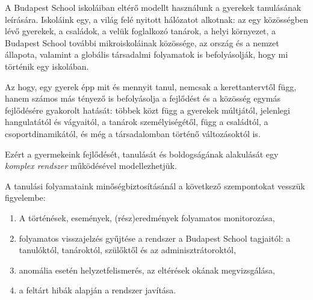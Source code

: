 A Budapest School iskoláiban eltérő modellt használunk a gyerekek tanulásának leírására. Iskoláink egy, a világ felé nyitott hálózatot alkotnak: az egy közösségben lévő gyerekek, a családok, a velük foglalkozó tanárok, a helyi környezet, a Budapest School további mikroiskoláinak közössége, az ország és a nemzet állapota, valamint a globális társadalmi folyamatok is befolyásolják, hogy mi történik egy iskolában.

Az hogy, egy gyerek épp mit és mennyit tanul, nemcsak a kerettantervtől függ, hanem számos más tényező is befolyásolja a fejlődést és a közösség egymás fejlődésére gyakorolt hatását: többek közt függ a gyerekek múltjától, jelenlegi hangulatától és vágyaitól, a tanárok személyiségétől, függ a családtól, a csoportdinamikától, és még a társadalomban történő változásoktól is.

Ezért a gyermekeink fejlődését, tanulását és boldogságának alakulását egy \emph{komplex rendszer} működésével modellezhetjük.

A tanulási folyamataink minőségbiztosításánál a következő szempontokat vesszük figyelembe:
\begin{enumerate}
\item  A történések, események, (rész)eredmények folyamatos monitorozása,
\item folyamatos visszajelzés gyűjtése a rendszer a Budapest School tagjaitól: a tanulóktól, tanároktól, szülőktől és az adminisztrátoroktól,
\item anomália esetén helyzetfelismerés, az eltérések okának megvizsgálása,
\item a feltárt hibák alapján a rendszer javítása.
\end{enumerate}

